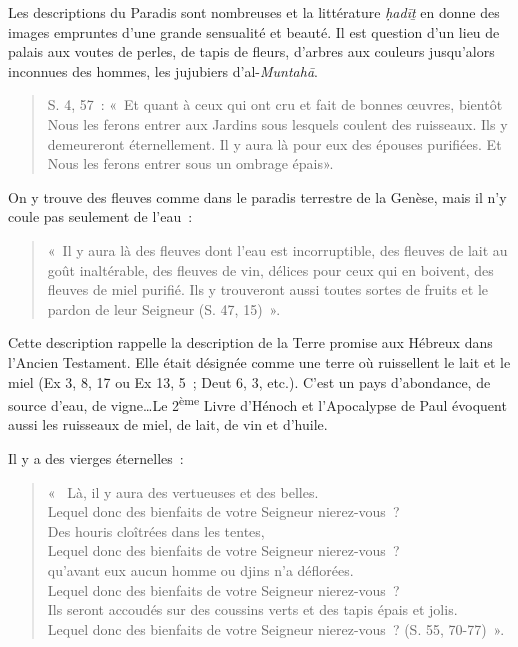 
Les descriptions du Paradis sont nombreuses et la littérature
\emph{ḥadīṯ} en donne des images empruntes d'une grande sensualité et
beauté. Il est question d'un lieu de palais aux voutes de perles, de
tapis de fleurs, d'arbres aux couleurs jusqu'alors inconnues des hommes,
les jujubiers d'al-\emph{Muntahā}.
\begin{quote}
    S. 4, 57~: «~Et quant à ceux qui ont cru et fait de bonnes œuvres,
bientôt Nous les ferons entrer aux Jardins sous lesquels coulent des
ruisseaux. Ils y demeureront éternellement. Il y aura là pour eux des
épouses purifiées. Et Nous les ferons entrer sous un ombrage épais».
\end{quote}


On y trouve des fleuves comme dans le paradis terrestre de la Genèse,
mais il n'y coule pas seulement de l'eau~:
\begin{quote}
    «~Il y aura là des fleuves dont l'eau est incorruptible, des fleuves de
lait au goût inaltérable, des fleuves de vin, délices pour ceux qui en
boivent, des fleuves de miel purifié. Ils y trouveront aussi toutes
sortes de fruits et le pardon de leur Seigneur (S. 47, 15)~».
\end{quote}


Cette description rappelle la description de la Terre promise aux
Hébreux dans l'Ancien Testament. Elle était désignée comme une terre où
ruissellent le lait et le miel (Ex 3, 8, 17 ou Ex 13, 5~; Deut 6, 3,
etc.). C'est un pays d'abondance, de source d'eau, de vigne\ldots Le
2\textsuperscript{ème} Livre d'Hénoch et l'Apocalypse de Paul évoquent
aussi les ruisseaux de miel, de lait, de vin et d'huile.

Il y a des vierges éternelles~:
\begin{quote}
    «~ Là, il y aura des vertueuses et des belles.\\
Lequel donc des bienfaits de votre Seigneur nierez-vous~?\\
Des houris cloîtrées dans les tentes,\\
Lequel donc des bienfaits de votre Seigneur nierez-vous~?\\
qu'avant eux aucun homme ou djins n'a déflorées.\\
Lequel donc des bienfaits de votre Seigneur nierez-vous~?\\
Ils seront accoudés sur des coussins verts et des tapis épais et
jolis.\\
Lequel donc des bienfaits de votre Seigneur nierez-vous~? (S. 55,
70-77)~».
\end{quote}


